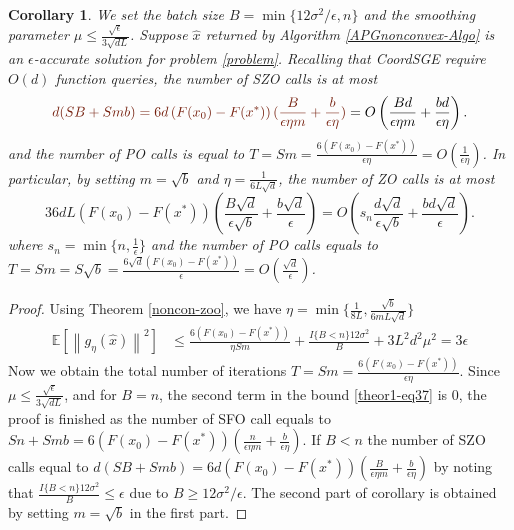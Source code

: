 \documentclass{article}
\newcommand*{\E}{\mathbb{E}}
\newcommand{\norm}[1]{\left\lVert#1\right\rVert}
\newtheorem{corollary}[theorem]{Corollary}
\theoremstyle{definition}
\theoremstyle{remark}
\begin{document}
 \begin{corollary}\label{corr11}
We set the batch size $B = \min\{12\sigma^2/\epsilon, n\}$ and the smoothing parameter $\mu \leq \frac{\sqrt{\epsilon}}{3\sqrt{dL}}$. Suppose $\hat{x}$ returned by Algorithm \ref{APGnonconvex-Algo}  is an $\epsilon$-accurate solution for problem \eqref{problem}. Recalling that CoordSGE require $O(d)$ function queries, the number of SZO calls is at most 
\begin{equation}\label{SZO-call-nocon}
{\color{Brown}d(SB+Smb) = 6d \left(F(x_0) - F({x}^*)\right) (\frac{B}{\epsilon\eta m}+\frac{b}{\epsilon\eta})} = O\left(\frac{Bd}{\epsilon\eta m}+\frac{bd}{\epsilon\eta}\right).
\end{equation} 
and the number of PO calls is equal to $T = Sm = \frac{6\left(F(x_0) - F({x}^*)\right)}{\epsilon\eta} = O\left(\frac{1}{\epsilon\eta}\right)$. In particular, by setting $m=\sqrt{b}$ and {\color{Brown}$\eta = \frac{1}{6L\sqrt{d}}$}, the number of ZO calls is at most 
\begin{equation}\label{SZO-call-par-nocon}
36d L (F(x_0)-F(x^*))\left(\frac{B\sqrt{d}}{\epsilon\sqrt{b}}+\frac{b\sqrt{d}}{\epsilon}\right) = O\left(s_n\frac{d\sqrt{d}}{\epsilon \sqrt{b}}+\frac{bd\sqrt{d}}{\epsilon}\right).
\end{equation}
where $s_n = \min\{n,\frac{1}{\epsilon}\}$ and the number of PO calls equals to $T = Sm = S\sqrt{b} = \frac{6\sqrt{d}\left(F(x_0) - F({x}^*)\right)}{\epsilon} = O\left(\frac{\sqrt{d}}{\epsilon}\right)$. 
\end{corollary}
\begin{proof}
Using Theorem \ref{noncon-zoo}, we have $\eta = \min\{\frac{1}{8L}, \frac{\sqrt{b}}{6mL\sqrt{d}}\}$
\begin{align}
\E[\norm{g_{\eta}(\hat{x})}^2] & \leq \frac{6\left(F(x_0) - F({x}^*)\right)}{\eta Sm} + \frac{I\{B < n\}12 \sigma ^2}{B}+3{L^2 d^2 \mu^2} = 3\epsilon\label{theor1-eq37}
 \end{align} 
 Now we obtain the total number of iterations  {\color{Brown} $T = Sm = \frac{6\left(F(x_0) - F({x}^*)\right)}{\epsilon\eta}$}. Since $\mu \leq \frac{\sqrt{\epsilon}}{3\sqrt{dL}}$, and for $B = n$, the second term in the bound \eqref{theor1-eq37} is $0$, the proof is finished as the number of SFO call equals to {\color{Brown}$Sn+Smb = 6 \left(F(x_0) - F({x}^*)\right) (\frac{n}{\epsilon\eta m}+\frac{b}{\epsilon\eta})$}. If  $B < n$ the number of SZO calls equal to  {\color{Brown}$d(SB+Smb) = 6d \left(F(x_0) - F({x}^*)\right) (\frac{B}{\epsilon\eta m}+\frac{b}{\epsilon\eta})$} by noting that $\frac{I\{B < n\}12\sigma^2}{B} \leq \epsilon$ due to $B \geq 12\sigma^2 /\epsilon$. The second part of corollary is obtained by setting $m = \sqrt{b}$ in the first part.
\end{proof}
\end{document}
